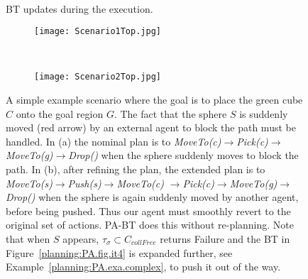 \begin{figure}[t]
        \caption{BT updates during the execution.}
         \label{planning:PA.fig.it1to4}              
        ~ %

\end{figure}


\begin{figure}[t!]
    \centering
    \begin{subfigure}[t]{0.485\columnwidth}
        \centering
\texttt{[image: Scenario1Top.jpg]}
         \caption{}
    \end{subfigure}%
    ~ 
    \begin{subfigure}[t]{0.485\columnwidth}
        \centering
\texttt{[image: Scenario2Top.jpg]}
   \caption{}
    \end{subfigure}
    \vspace{1em}
    \caption{
    A simple example scenario where the
    goal is to place the green cube $C$ onto the goal region $G$. The fact that the sphere $S$  is suddenly moved (red arrow) by an external agent to  block the path must be handled.
    In (a) the nominal plan is to \emph{MoveTo(c)$\to$Pick(c)$\to$MoveTo(g)$\to$Drop()} when the sphere suddenly moves to block the path. 
    In (b), after refining the plan, the extended plan is to \emph{MoveTo(s)$\to$Push(s)$\to$MoveTo(c)} 
        \emph{$\to$Pick(c)$\to$MoveTo(g)$\to$Drop()} when the sphere is again suddenly moved by another agent, before being pushed. Thus our agent must smoothly revert to the original set of actions. PA-BT does this without re-planning. Note that when $S$ appears, $\tau_\sigma \subset C_{collFree}$ returns Failure and the BT in Figure~\ref{planning:PA.fig.it4} is expanded further, see Example~\ref{planning:PA.exa.complex},  to push it out of the way. }
    \label{planning:IN.fig.front}
\end{figure}


